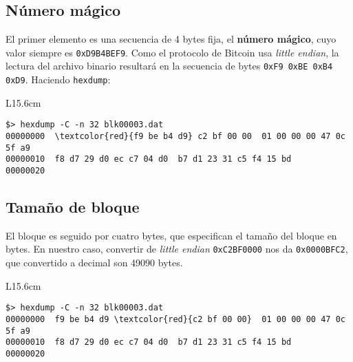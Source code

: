 \documentclass[10pt, a4paper]{article}
\theoremstyle{theorem-style}
\theoremstyle{theorem-style}
\theoremstyle{definition-style}
\theoremstyle{remark-style}
\theoremstyle{example-style}
\theoremstyle{definition-style}
\theoremstyle{remark-style}
\begin{document}
\subsection{Número mágico}

El primer elemento es una secuencia de 4 bytes fija, el \textbf{número mágico}, cuyo valor siempre es \texttt{0xD9B4BEF9}. Como el protocolo de Bitcoin usa \emph{little endian}, la lectura del archivo binario resultará en la secuencia de bytes \texttt{0xF9 0xBE 0xB4 0xD9}. Haciendo \texttt{hexdump}:

\begin{table}[h]
\begin{tabular}{L{15.6cm}}
\begin{minipage}{3in}
\vspace{0.3cm}
\begin{Verbatim}[commandchars=\\\{\}]
$> hexdump -C -n 32 blk00003.dat
00000000  \textcolor{red}{f9 be b4 d9} c2 bf 00 00  01 00 00 00 47 0c 5f a9
00000010  f8 d7 29 d0 ec c7 04 d0  b7 d1 23 31 c5 f4 15 bd
00000020
\end{Verbatim}
\vspace{0cm}
\end{minipage}
\end{tabular}
\end{table}

\subsection{Tamaño de bloque}

El bloque es seguido por cuatro bytes, que especifican el tamaño del bloque en bytes. En nuestro caso, convertir de \emph{little endian} \texttt{0xC2BF0000} nos da \texttt{0x0000BFC2}, que convertido a decimal son 49090 bytes.

\begin{table}[h]
\begin{tabular}{L{15.6cm}}
\begin{minipage}{1in}
\vspace{0.3cm}
\begin{Verbatim}[commandchars=\\\{\}]
$> hexdump -C -n 32 blk00003.dat
00000000  f9 be b4 d9 \textcolor{red}{c2 bf 00 00}  01 00 00 00 47 0c 5f a9
00000010  f8 d7 29 d0 ec c7 04 d0  b7 d1 23 31 c5 f4 15 bd
00000020
\end{Verbatim}
\vspace{0cm}
\end{minipage}
\end{tabular}
\end{table}
\end{document}
